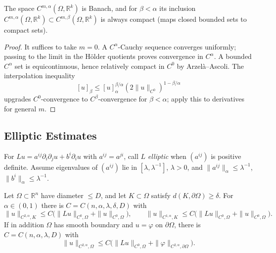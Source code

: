 \begin{lemma}
  \label{lem:pet-ch11-holder-space-banach-compact-inclusion}

  The space $C^{m,\alpha}(\Omega,\mathbb{R}^k)$ is Banach, and for
  $\beta<\alpha$ its inclusion
  $C^{m,\alpha}(\Omega,\mathbb{R}^k)\subset C^{m,\beta}(\Omega,\mathbb{R}^k)$ is
  always compact (maps closed bounded sets to compact sets).
\end{lemma}
\begin{proof}
  \sketch
  It suffices to take \(m=0\). A \(C^\alpha\)-Cauchy sequence converges uniformly; passing to the limit in the Hölder quotients proves convergence in \(C^\alpha\). A bounded \(C^\alpha\) set is equicontinuous, hence relatively compact in \(C^0\) by Arzelà--Ascoli. The interpolation inequality
  \[
    [u]_\beta\le [u]_\alpha^{\beta/\alpha}(2\|u\|_{C^0})^{1-\beta/\alpha}
  \]
  upgrades \(C^0\)-convergence to \(C^\beta\)-convergence for \(\beta<\alpha\); apply this to derivatives for general \(m\).
\end{proof}


\subsection{Elliptic Estimates}

\begin{definition}
  \label{def:pet-ch11-elliptic-operator}

  For $Lu=a^{ij}\partial_i\partial_ju+b^i\partial_iu$ with $a^{ij}=a^{ji}$,
  call $L$ \emph{elliptic} when $(a^{ij})$ is positive definite. Assume
  eigenvalues of $(a^{ij})$ lie in $[\lambda,\lambda^{-1}]$, $\lambda>0$, and
  $\|a^{ij}\|_\alpha\le\lambda^{-1}$, $\|b^i\|_\alpha\le\lambda^{-1}$.
\end{definition}

\begin{theorem}
  \label{thm:pet-ch11-schauder-estimates}

  Let $\Omega\subset\mathbb{R}^n$ have diameter $\le D$, and let
  $K\subset\Omega$ satisfy $d(K,\partial\Omega)\ge\delta$. For
  $\alpha\in(0,1)$ there is
  $C=C(n,\alpha,\lambda,\delta,D)$ with
  \[
    \|u\|_{C^{2,\alpha},K}\le C\big(\|Lu\|_{C^0,\Omega}+\|u\|_{C^0,\Omega}\big),
    \qquad
    \|u\|_{C^{1,\alpha},K}\le C\big(\|Lu\|_{C^0,\Omega}+\|u\|_{C^0,\Omega}\big).
  \]
  If in addition $\Omega$ has smooth boundary and $u=\varphi$ on
  $\partial\Omega$, there is $C=C(n,\alpha,\lambda,D)$ with
  \[
    \|u\|_{C^{2,\alpha},\Omega}\le C\big(\|Lu\|_{C^0,\Omega}+\|\varphi\|_{C^{2,\alpha},\partial\Omega}\big).
  \]
\end{theorem}

